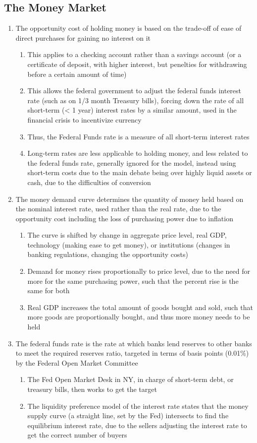 \subsection{The Money Market}
\begin{enumerate}
\item The opportunity cost of holding money is based on the trade-off of ease of direct purchases for gaining no interest on it
\begin{enumerate}
\item This applies to a checking account rather than a savings account (or a certificate of deposit, with higher interest, but penelties for withdrawing before a certain amount of time)
\item This allows the federal government to adjust the federal funds interest rate (such as on 1/3 month Treasury bills), forcing down the rate of all short-term (< 1 year) interest rates by a similar amount, used in the financial crisis to incentivize currency
\item Thus, the Federal Funds rate is a measure of all short-term interest rates
\item Long-term rates are less applicable to holding money, and less related to the federal funds rate, generally ignored for the model, instead using short-term costs due to the main debate being over highly liquid assets or cash, due to the difficulties of conversion
\end{enumerate}
\item The money demand curve determines the quantity of money held based on the nominal interest rate, used rather than the real rate, due to the opportunity cost including the loss of purchasing power due to inflation
\begin{enumerate}
\item The curve is shifted by change in aggregate price level, real GDP, technology (making ease to get money), or institutions (changes in banking regulations, changing the opportunity costs)
\item Demand for money rises proportionally to price level, due to the need for more for the same purchasing power, such that the percent rise is the same for both
\item Real GDP increases the total amount of goods bought and sold, such that more goods are proportionally bought, and thus more money needs to be held
\end{enumerate}
\item The federal funds rate is the rate at which banks lend reserves to other banks to meet the required reserves ratio, targeted in terms of basis points (0.01\%) by the Federal Open Market Committee
\begin{enumerate}
\item The Fed Open Market Desk in NY, in charge of short-term debt, or treasury bills, then works to get the target
\item The liquidity preference model of the interest rate states that the money supply curve (a straight line, set by the Fed) intersects to find the equilibrium interest rate, due to the sellers adjusting the interest rate to get the correct number of buyers
\end{enumerate}
\end{enumerate}
